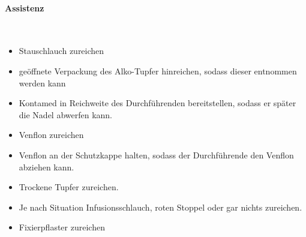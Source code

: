 \paragraph*{Assistenz}~


\begin{itemize}
    \item Stauschlauch zureichen
    \item geöffnete Verpackung des Alko-Tupfer hinreichen, sodass dieser
    entnommen werden kann
    \item Kontamed in Reichweite des  Durchführenden
    bereitstellen, sodass er später die Nadel abwerfen kann.
    \item Venflon zureichen
\end{itemize}
\begin{itemize}
    \item Venflon an der Schutzkappe halten, sodass der
    Durchführende den Venflon abziehen kann.
    
\end{itemize}
\begin{itemize}
    \item Trockene Tupfer zureichen.
    \item Je nach Situation Infusionsschlauch, roten Stoppel oder gar nichts
    zureichen.
    \item Fixierpflaster zureichen
\end{itemize}





